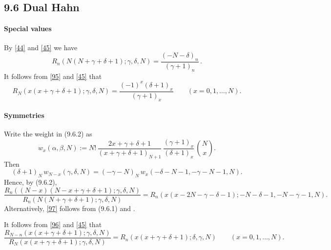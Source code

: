 \documentclass[twoside,11pt]{article}
\newcommand\al\alpha
\newcommand\be\beta
\newcommand\ga\gamma
\newcommand\de\delta
\begin{document}
\subsection*{9.6 Dual Hahn}
\label{sec9.6}
%
\paragraph{Special values}
By \eqref{44} and \eqref{45} we have
\begin{equation}
R_n(N(N+\ga+\de+1);\ga,\de,N)=\frac{(-N-\de)_n}{(\ga+1)_n}\,.
\label{47}
\end{equation}
It follows from \eqref{95} and \eqref{45} that
\begin{equation}
R_N(x(x+\ga+\de+1);\ga,\de,N)
=\frac{(-1)^x(\de+1)_x}{(\ga+1)_x}\qquad(x=0,1,\ldots,N).
\label{101}
\end{equation}
%
\paragraph{Symmetries}
Write the weight in (9.6.2) as
\begin{equation}
w_x(\al,\be,N):=N!\,\frac{2x+\ga+\de+1}{(x+\ga+\de+1)_{N+1}}\,
\frac{(\ga+1)_x}{(\de+1)_x}\,\binom Nx.
\label{98}
\end{equation}
Then
\begin{equation}
(\de+1)_N\,w_{N-x}(\ga,\de,N)=
(-\ga-N)_N\,w_x(-\de-N-1,-\ga-N-1,N).
\label{99}
\end{equation}
Hence, by (9.6.2),
\begin{equation}
\frac{R_n((N-x)(N-x+\ga+\de+1);\ga,\de,N)}{R_n(N(N+\ga+\de+1);\ga,\de,N)}
=R_n(x(x-2N-\ga-\de-1);-N-\de-1,-N-\ga-1,N).
\label{97}
\end{equation}
Alternatively, \eqref{97} follows from (9.6.1) and
.

It follows from \eqref{96} and \eqref{45} that
\begin{equation}
\frac{R_{N-n}(x(x+\ga+\de+1);\ga,\de,N)}
{R_N(x(x+\ga+\de+1);\ga,\de,N)}
=R_n(x(x+\ga+\de+1);\de,\ga,N)\qquad(x=0,1,\ldots,N).
\label{102}
\end{equation}
%
\end{document}
